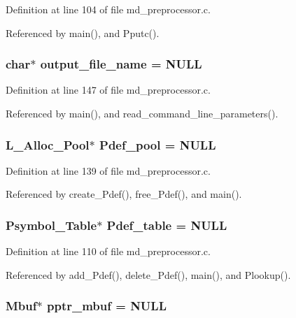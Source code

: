 Definition at line 104 of file md\_\-preprocessor.c.

Referenced by main(), and Pputc().
\subsubsection{\setlength{\rightskip}{0pt plus 5cm}char$\ast$ \bf{output\_\-file\_\-name} = \bf{NULL}}\label{md__preprocessor_8c_cdcd0d11bb729145f180d52a0755cddf}




Definition at line 147 of file md\_\-preprocessor.c.

Referenced by main(), and read\_\-command\_\-line\_\-parameters().
\subsubsection{\setlength{\rightskip}{0pt plus 5cm}\bf{L\_\-Alloc\_\-Pool}$\ast$ \bf{Pdef\_\-pool} = \bf{NULL}}\label{md__preprocessor_8c_8f8faa045221340e2f32e6bb958db91b}




Definition at line 139 of file md\_\-preprocessor.c.

Referenced by create\_\-Pdef(), free\_\-Pdef(), and main().
\subsubsection{\setlength{\rightskip}{0pt plus 5cm}\bf{Psymbol\_\-Table}$\ast$ \bf{Pdef\_\-table} = \bf{NULL}}\label{md__preprocessor_8c_97741975f920c10105047ce529cf052a}




Definition at line 110 of file md\_\-preprocessor.c.

Referenced by add\_\-Pdef(), delete\_\-Pdef(), main(), and Plookup().
\subsubsection{\setlength{\rightskip}{0pt plus 5cm}\bf{Mbuf}$\ast$ \bf{pptr\_\-mbuf} = \bf{NULL}}\label{md__preprocessor_8c_a66fcb8ee43325dd5745131d0eca2b57}




